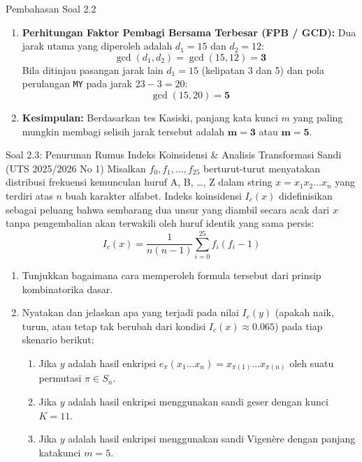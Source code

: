 \documentclass[11pt,a4paper]{article}
\begin{document}
\begin{solusibox}{Pembahasan Soal 2.2}
\begin{enumerate}[leftmargin=*]
\begin{itemize}
\begin{itemize}
            Periksa substring \texttt{"KQ"} pada indeks: 8 (\texttt{K(8) Q(9)}), 15 (\texttt{K(15) X(16) Q(17)}), 20 (\texttt{K(20) Q(21)}).
            Selisih posisi antara indeks 20 dan 8: $d_2 = 20 - 8 = \mathbf{12}$.
            \item Tinjau substring \texttt{"XQ"}:
            Muncul pada indeks 1 (\texttt{X(1) Q(2)}), indeks 16 (\texttt{X(16) Q(17)}), dan indeks 17 (\texttt{Q(17) Q(18) X(19)}).
            Jarak: $16 - 1 = \mathbf{15}$.
        \end{itemize}
    \end{itemize}
    \item \textbf{Perhitungan Faktor Pembagi Bersama Terbesar (FPB / GCD):}
    Dua jarak utama yang diperoleh adalah $d_1 = 15$ dan $d_2 = 12$:
    \[
    \gcd(d_1, d_2) = \gcd(15, 12) = \mathbf{3}
    \]
    Bila ditinjau pasangan jarak lain $d_1 = 15$ (kelipatan 3 dan 5) dan pola perulangan \texttt{MY} pada jarak $23 - 3 = 20$:
    \[
    \gcd(15, 20) = \mathbf{5}
    \]
    \item \textbf{Kesimpulan:} Berdasarkan tes Kasiski, panjang kata kunci $m$ yang paling mungkin membagi selisih jarak tersebut adalah $\mathbf{m = 3}$ atau $\mathbf{m = 5}$.
\end{enumerate}
\end{solusibox}

\vspace{0.4cm}

\begin{soalbox}{Soal 2.3: Penurunan Rumus Indeks Koinsidensi \& Analisis Transformasi Sandi (UTS 2025/2026 No 1)}
Misalkan $f_0, f_1, \dots, f_{25}$ berturut-turut menyatakan distribusi frekuensi kemunculan huruf A, B, \dots, Z dalam string $x = x_1 x_2 \dots x_n$ yang terdiri atas $n$ buah karakter alfabet.
Indeks koinsidensi $I_c(x)$ didefinisikan sebagai peluang bahwa sembarang dua unsur yang diambil secara acak dari $x$ tanpa pengembalian akan terwakili oleh huruf identik yang sama persis:
\[
I_c(x) = \frac{1}{n(n - 1)} \sum_{i=0}^{25} f_i (f_i - 1)
\]
\begin{enumerate}[label=(\alph*)]
    \item Tunjukkan bagaimana cara memperoleh formula tersebut dari prinsip kombinatorika dasar.
    \item Nyatakan dan jelaskan apa yang terjadi pada nilai $I_c(y)$ (apakah naik, turun, atau tetap tak berubah dari kondisi $I_c(x) \approx 0.065$) pada tiap skenario berikut:
    \begin{enumerate}[label=(\roman*)]
        \item Jika $y$ adalah hasil enkripsi $e_\pi(x_1 \dots x_n) = x_{\pi(1)} \dots x_{\pi(n)}$ oleh suatu permutasi $\pi \in S_n$.
        \item Jika $y$ adalah hasil enkripsi menggunakan sandi geser dengan kunci $K = 11$.
        \item Jika $y$ adalah hasil enkripsi menggunakan sandi Vigen\`ere dengan panjang katakunci $m = 5$.
    \end{enumerate}
\end{enumerate}
\end{soalbox}
\end{document}
